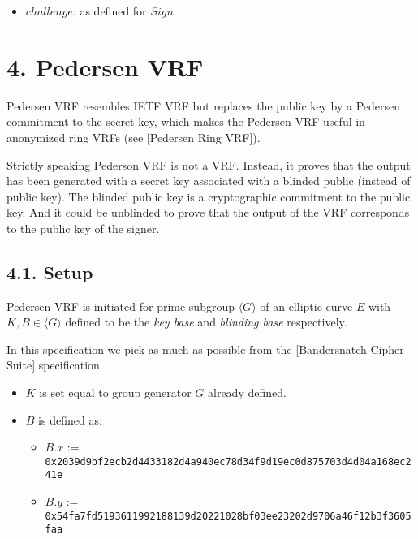 \documentclass[
]{article}
\providecommand{\tightlist}{%
  \setlength{\itemsep}{0pt}\setlength{\parskip}{0pt}}
\begin{document}
\begin{itemize}
\tightlist
\item
  \(challenge\): as defined for \(Sign\)
\end{itemize}

\hypertarget{pedersen-vrf}{%
\section{4. Pedersen VRF}\label{pedersen-vrf}}

Pedersen VRF resembles IETF VRF but replaces the public key by a
Pedersen commitment to the secret key, which makes the Pedersen VRF
useful in anonymized ring VRFs (see {[}Pedersen Ring VRF{]}).

Strictly speaking Pederson VRF is not a VRF. Instead, it proves that the
output has been generated with a secret key associated with a blinded
public (instead of public key). The blinded public key is a
cryptographic commitment to the public key. And it could be unblinded to
prove that the output of the VRF corresponds to the public key of the
signer.

\hypertarget{setup-1}{%
\subsection{4.1. Setup}\label{setup-1}}

Pedersen VRF is initiated for prime subgroup \(\langle G \rangle\) of an
elliptic curve \(E\) with \(K, B \in \langle G \rangle\) defined to be
the \emph{key base} and \emph{blinding base} respectively.

In this specification we pick as much as possible from the
{[}Bandersnatch Cipher Suite{]} specification.

\begin{itemize}
\tightlist
\item
  \(K\) is set equal to group generator \(G\) already defined.
\item
  \(B\) is defined as:

  \begin{itemize}
  \tightlist
  \item
    \(B.x\) :=
    \texttt{0x2039d9bf2ecb2d4433182d4a940ec78d34f9d19ec0d875703d4d04a168ec241e}
  \item
    \(B.y\) :=
    \texttt{0x54fa7fd5193611992188139d20221028bf03ee23202d9706a46f12b3f3605faa}
  \end{itemize}
\end{itemize}
\end{document}
